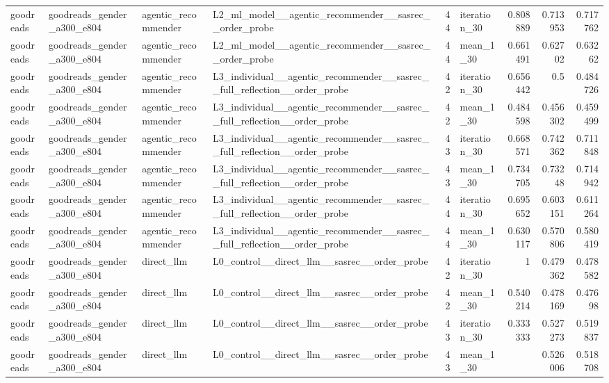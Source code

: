 \begin{table}[htbp!]
\begin{tabular}{llllrlrrr}
goodreads & goodreads\_gender\_a300\_e804 & agentic\_recommender & L2\_ml\_model\_\_agentic\_recommender\_\_sasrec\_\_order\_probe & 44 & iteration\_30 & 0.808889 & 0.713953 & 0.717762 \\
goodreads & goodreads\_gender\_a300\_e804 & agentic\_recommender & L2\_ml\_model\_\_agentic\_recommender\_\_sasrec\_\_order\_probe & 44 & mean\_1\_30 & 0.661491 & 0.62702 & 0.63262 \\
goodreads & goodreads\_gender\_a300\_e804 & agentic\_recommender & L3\_individual\_\_agentic\_recommender\_\_sasrec\_\_full\_reflection\_\_order\_probe & 42 & iteration\_30 & 0.656442 & 0.5 & 0.484726 \\
goodreads & goodreads\_gender\_a300\_e804 & agentic\_recommender & L3\_individual\_\_agentic\_recommender\_\_sasrec\_\_full\_reflection\_\_order\_probe & 42 & mean\_1\_30 & 0.484598 & 0.456302 & 0.459499 \\
goodreads & goodreads\_gender\_a300\_e804 & agentic\_recommender & L3\_individual\_\_agentic\_recommender\_\_sasrec\_\_full\_reflection\_\_order\_probe & 43 & iteration\_30 & 0.668571 & 0.742362 & 0.711848 \\
goodreads & goodreads\_gender\_a300\_e804 & agentic\_recommender & L3\_individual\_\_agentic\_recommender\_\_sasrec\_\_full\_reflection\_\_order\_probe & 43 & mean\_1\_30 & 0.734705 & 0.73248 & 0.714942 \\
goodreads & goodreads\_gender\_a300\_e804 & agentic\_recommender & L3\_individual\_\_agentic\_recommender\_\_sasrec\_\_full\_reflection\_\_order\_probe & 44 & iteration\_30 & 0.695652 & 0.603151 & 0.611264 \\
goodreads & goodreads\_gender\_a300\_e804 & agentic\_recommender & L3\_individual\_\_agentic\_recommender\_\_sasrec\_\_full\_reflection\_\_order\_probe & 44 & mean\_1\_30 & 0.630117 & 0.570806 & 0.580419 \\
goodreads & goodreads\_gender\_a300\_e804 & direct\_llm & L0\_control\_\_direct\_llm\_\_sasrec\_\_order\_probe & 42 & iteration\_30 & 1 & 0.479362 & 0.478582 \\
goodreads & goodreads\_gender\_a300\_e804 & direct\_llm & L0\_control\_\_direct\_llm\_\_sasrec\_\_order\_probe & 42 & mean\_1\_30 & 0.540214 & 0.478169 & 0.47698 \\
goodreads & goodreads\_gender\_a300\_e804 & direct\_llm & L0\_control\_\_direct\_llm\_\_sasrec\_\_order\_probe & 43 & iteration\_30 & 0.333333 & 0.527273 & 0.519837 \\
goodreads & goodreads\_gender\_a300\_e804 & direct\_llm & L0\_control\_\_direct\_llm\_\_sasrec\_\_order\_probe & 43 & mean\_1\_30 & \textemdash{} & 0.526006 & 0.518708 \\

\end{tabular}
\end{table}
